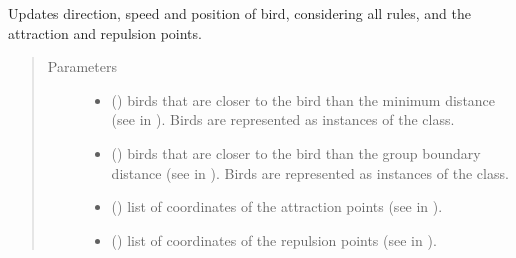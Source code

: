 \documentclass[a4paper,11pt,oneside,english]{sphinxmanual}
\begin{document}
\begin{fulllineitems}
\begin{fulllineitems}
\label{\detokenize{bird:bird.Bird.update}}
Updates direction, speed and position of bird, considering all rules, and the attraction and repulsion points.
\begin{quote}\begin{description}
\item[{Parameters}] \leavevmode\begin{itemize}
\item {} 
 () \textendash{} birds that are closer to the bird than the minimum distance (see  in {\hyperref[\detokenize{parameters:module-0}]{}}). Birds are represented as instances of the {\hyperref[\detokenize{bird:bird.Bird}]{}} class.

\item {} 
 () \textendash{} birds that are closer to the bird than the group boundary distance (see  in {\hyperref[\detokenize{parameters:module-0}]{}}). Birds are represented as instances of the {\hyperref[\detokenize{bird:bird.Bird}]{}} class.

\item {} 
 () \textendash{} list of coordinates of the attraction points (see  in {\hyperref[\detokenize{parameters:module-0}]{}}).

\item {} 
 () \textendash{} list of coordinates of the repulsion points (see  in {\hyperref[\detokenize{parameters:module-0}]{}}).


\end{itemize}
\end{description}
\end{quote}
\end{fulllineitems}
\end{fulllineitems}
\end{document}
